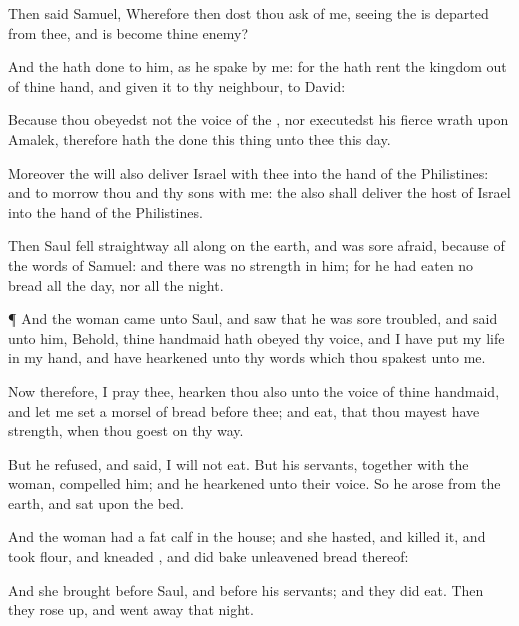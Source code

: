 {Then
said
Samuel, Wherefore then dost thou
ask of me, seeing the
{} is
departed from thee, and is become thine
enemy?

And the
{} hath
done to him, as he
spake by
me: for the
{} hath
rent the
kingdom out of thine
hand, and
given it to thy
neighbour,
{} to
David:

Because thou
obeyedst not the
voice of the
{}, nor
executedst his
fierce
wrath upon
Amalek, therefore hath the
{}
done this
thing unto thee this
day.

Moreover the
{} will also
deliver
Israel with thee into the
hand of the
Philistines: and to
morrow
{} thou and thy
sons
{} with me: the
{} also shall
deliver the
host of
Israel into the
hand of the
Philistines.


\par }{\PP {}Then
Saul
fell
straightway
all
along on the
earth, and was
sore
afraid, because of the
words of
Samuel: and there was no
strength in him; for he had
eaten no
bread all the
day, nor all the
night.


\par }{\PP {}¶ And the
woman
came unto
Saul, and
saw that he was
sore
troubled, and
said unto him, Behold, thine
handmaid hath
obeyed thy
voice, and I have
put my
life in my
hand, and have
hearkened unto thy
words which thou
spakest unto me.

Now therefore, I pray thee,
hearken thou also unto the
voice of thine
handmaid, and let me
set a
morsel of
bread
before thee; and
eat, that thou mayest have
strength, when thou
goest on thy
way.

But he
refused, and
said, I will not
eat. But his
servants, together with the
woman,
compelled him; and he
hearkened unto their
voice. So he
arose from the
earth, and
sat upon the
bed.

And the
woman had a
fat
calf in the
house; and she
hasted, and
killed it, and
took
flour, and
kneaded
{}, and did
bake unleavened
bread thereof:

And she
brought
{}
before
Saul, and
before his
servants; and they did
eat. Then they rose
up, and went
away that
night.




}
